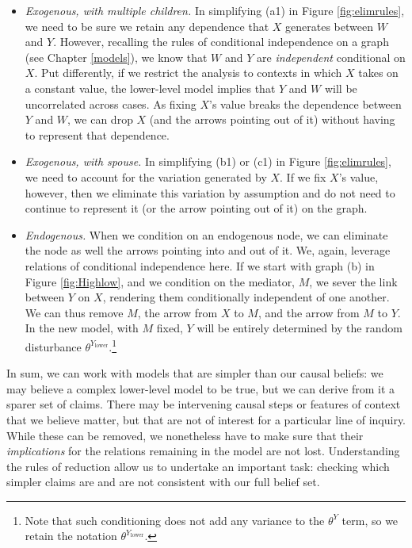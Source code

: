 \documentclass[12pt,]{book}
\providecommand{\tightlist}{%
  \setlength{\itemsep}{0pt}\setlength{\parskip}{0pt}}
\let\rmarkdownfootnote\footnote%
\def\footnote{\protect\rmarkdownfootnote}
\begin{document}
\begin{itemize}
\tightlist
\item
  \emph{Exogenous, with multiple children.} In simplifying (a1) in Figure \ref{fig:elimrules}, we need to be sure we retain any dependence that \(X\) generates between \(W\) and \(Y\). However, recalling the rules of conditional independence on a graph (see Chapter \ref{models}), we know that \(W\) and \(Y\) are \emph{independent} conditional on \(X\). Put differently, if we restrict the analysis to contexts in which \(X\) takes on a constant value, the lower-level model implies that \(Y\) and \(W\) will be uncorrelated across cases. As fixing \(X\)'s value breaks the dependence between \(Y\) and \(W\), we can drop \(X\) (and the arrows pointing out of it) without having to represent that dependence.
\item
  \emph{Exogenous, with spouse.} In simplifying (b1) or (c1) in Figure \ref{fig:elimrules}, we need to account for the variation generated by \(X\). If we fix \(X\)'s value, however, then we eliminate this variation by assumption and do not need to continue to represent it (or the arrow pointing out of it) on the graph.
\item
  \emph{Endogenous.} When we condition on an endogenous node, we can eliminate the node as well the arrows pointing into and out of it. We, again, leverage relations of conditional independence here. If we start with graph (b) in Figure \ref{fig:Highlow}, and we condition on the mediator, \(M\), we sever the link between \(Y\) on \(X\), rendering them conditionally independent of one another. We can thus remove \(M\), the arrow from \(X\) to \(M\), and the arrow from \(M\) to \(Y\). In the new model, with \(M\) fixed, \(Y\) will be entirely determined by the random disturbance \(\theta^{Y_\text{lower}}\).\footnote{Note that such conditioning does not add any variance to the \(\theta^Y\) term, so we retain the notation \(\theta^{Y_\text{lower}}\).}
\end{itemize}

In sum, we can work with models that are simpler than our causal beliefs: we may believe a complex lower-level model to be true, but we can derive from it a sparer set of claims. There may be intervening causal steps or features of context that we believe matter, but that are not of interest for a particular line of inquiry. While these can be removed, we nonetheless have to make sure that their \emph{implications} for the relations remaining in the model are not lost. Understanding the rules of reduction allow us to undertake an important task: checking which simpler claims are and are not consistent with our full belief set.
\end{document}
